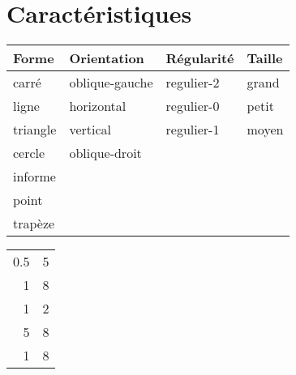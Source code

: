\documentclass[11pt]{article}
\author{Datross}
\date{\today}
\title{}
\begin{document}
\tableofcontents

\section{Caractéristiques}
\label{sec:org597c173}

\begin{center}
\begin{tabular}{llll}
Forme & Orientation & Régularité & Taille\\
\hline
carré & oblique-gauche & regulier-2 & grand\\
ligne & horizontal & regulier-0 & petit\\
triangle & vertical & regulier-1 & moyen\\
cercle & oblique-droit &  & \\
informe &  &  & \\
point &  &  & \\
trapèze &  &  & \\
\end{tabular}
\end{center}


\begin{center}
\begin{tabular}{rr}
0.5 & 5\\
1 & 8\\
1 & 2\\
5 & 8\\
1 & 8\\
\end{tabular}
\end{center}
\end{document}

